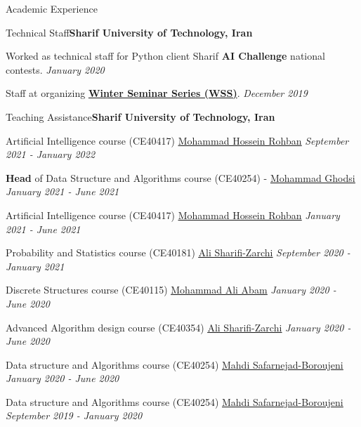 \documentclass{resume} %
\begin{document}
\begin{rSection}{Academic Experience}
\begin{rSubsection}{Technical Staff}{\textcolor{Black!70}{\bf Sharif University of Technology, Iran}}{}{}
\item Worked as technical staff for Python client Sharif \textbf{AI Challenge} national contests. \hfill \textcolor{Black!70}{\it January 2020}
\item Staff at organizing  \href{https://wss.ce.sharif.ir/}{\bf Winter Seminar Series (WSS)}. \hfill \textcolor{Black!70}{\it December 2019}
\end{rSubsection}
\begin{rSubsection}{Teaching Assistance}{\textcolor{Black!70}{\bf Sharif University of Technology, Iran}}{}{}
\begin{small}
\item Artificial Intelligence course (CE40417) \href{http://blogs.bu.edu/mhrohban/}{\underline{Mohammad Hossein Rohban}} \hfill \textcolor{Black!70}{\it September 2021 - January 2022}
\item {\bf Head}  of Data Structure and Algorithms course (CE40254) - \href{http://sharif.edu/~ghodsi/}{\underline{Mohammad Ghodsi}} \hfill \textcolor{Black!70}{\it January 2021 - June 2021}
\item Artificial Intelligence course (CE40417) \href{http://blogs.bu.edu/mhrohban/}{\underline{Mohammad Hossein Rohban}} \hfill \textcolor{Black!70}{\it January 2021 - June 2021}
\item Probability and Statistics course (CE40181) \href{https://scholar.google.com/citations?user=GbJMZLIAAAAJ&hl=en}{\underline{Ali Sharifi-Zarchi}} \hfill \textcolor{Black!70}{\it September 2020 - January 2021}
\item Discrete Structures course (CE40115) \href{https://scholar.google.com/citations?user=xuNJ-d8AAAAJ&hl=en}{\underline{Mohammad Ali Abam}} \hfill \textcolor{Black!70}{\it January 2020 - June 2020}
\item Advanced Algorithm design course (CE40354) \href{https://scholar.google.com/citations?user=GbJMZLIAAAAJ&hl=en}{\underline{Ali Sharifi-Zarchi}} \hfill \textcolor{Black!70}{\it January 2020 - June 2020} 
\item Data structure and Algorithms course (CE40254) \href{https://scholar.google.com/citations?user=TNfL9SIAAAAJ&hl=en}{\underline{Mahdi Safarnejad-Boroujeni}} \hfill \textcolor{Black!70}{\it January 2020 - June 2020}
\item Data structure and Algorithms course (CE40254) \href{https://scholar.google.com/citations?user=TNfL9SIAAAAJ&hl=en}{\underline{Mahdi Safarnejad-Boroujeni}} \hfill \textcolor{Black!70}{\it September 2019 - January 2020}
\end{small}
\end{rSubsection}
\end{rSection}
\end{document}
